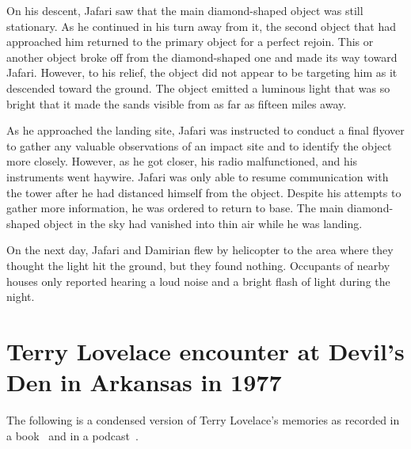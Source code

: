 On his descent, Jafari saw that the main diamond-shaped object was still stationary.
As he continued in his turn away from it, the second object that had approached him
returned to the primary object for a perfect rejoin.
This or another object broke off from the diamond-shaped one and made its way toward Jafari.
However, to his relief, the object did not appear to be targeting him as it descended toward the ground.
The object emitted
a luminous light that was so bright that it made the sands visible from as far as fifteen miles away.

As he approached the landing site, Jafari was instructed to conduct a final flyover to gather any valuable observations
of an impact site and to identify the object more closely.
However, as he got closer, his radio malfunctioned, and his instruments went haywire.
Jafari was only able to resume communication with the tower after he had distanced himself from the object.
Despite his attempts to gather more information, he was ordered to return to base.
The main diamond-shaped object in the sky had vanished into thin air while he was landing.

On the next day, Jafari and Damirian flew by helicopter to the area where they thought the light hit the ground, but they found nothing.
Occupants of nearby houses only reported hearing a loud noise and a bright flash of light during the night.

\section{Terry Lovelace encounter at Devil's Den in Arkansas in 1977}

\label{2023-UFO-chapter-History--1953-2016-tl1977}

The following is a condensed version of Terry Lovelace's memories as recorded in a book~\cite{Lovelace18}
and in a podcast~\cite{Iandoli2023Jan}.

